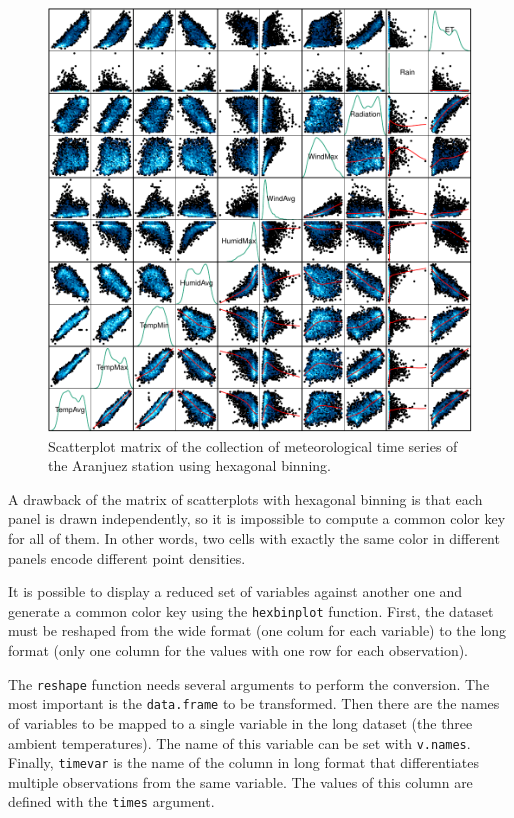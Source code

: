\documentclass[smallroyalvopaper]{memoir}
\begin{document}
\begin{figure}[htbp]
\centering
\includegraphics[width=.9\linewidth]{figs/aranjuezSplomHexbin.pdf}
\caption{Scatterplot matrix of the collection of meteorological time series of the Aranjuez station using hexagonal binning. \label{fig:aranjuezSplomHexbin}}
\end{figure}

A drawback of the matrix of scatterplots with hexagonal binning is
that each panel is drawn independently, so it is impossible to compute
a common color key for all of them. In other words, two cells with
exactly the same color in different panels encode different point
densities.

It is possible to display a reduced set of variables against
another one and generate a common color key using the \texttt{hexbinplot}
function. First, the dataset must be reshaped from the wide format
(one colum for each variable) to the long format (only one column for
the values with one row for each observation). 

The \texttt{reshape} function needs several arguments to perform the
conversion. The most important is the \texttt{data.frame} to be
transformed. Then there are the names of variables to be mapped to
a single variable in the long dataset (the three ambient
temperatures). The name of this variable can be set with
\texttt{v.names}. Finally, \texttt{timevar} is the name of the column in long format that
differentiates multiple observations from the same variable. The
values of this column are defined with the \texttt{times} argument.
\end{document}
